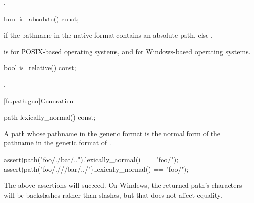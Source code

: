 \begin{itemdescr}
\pnum
\returns {}.
\end{itemdescr}

%
\begin{itemdecl}
bool is_absolute() const;
\end{itemdecl}

\begin{itemdescr}
\pnum
\returns {} if the pathname in the native format
  contains an absolute path, else .

\pnum
\begin{example}  is
       for  POSIX-based operating systems, and  for Windows-based
operating systems. \end{example}
\end{itemdescr}

%
\begin{itemdecl}
bool is_relative() const;
\end{itemdecl}

\begin{itemdescr}
\pnum
\returns {}.
\end{itemdescr}

[fs.path.gen]{Generation}

%
\begin{itemdecl}
path lexically_normal() const;
\end{itemdecl}

\begin{itemdescr}
\pnum
\returns A path whose pathname in the generic format is
the normal form of the pathname
in the generic format of .

\pnum
\begin{example}
\begin{codeblock}
assert(path("foo/./bar/..").lexically_normal() == "foo/");
assert(path("foo/.///bar/../").lexically_normal() == "foo/");
\end{codeblock}
The above assertions will succeed.
On Windows, the returned path's  characters
will be backslashes rather than slashes,
but that does not affect  equality.
\end{example}
\end{itemdescr}

